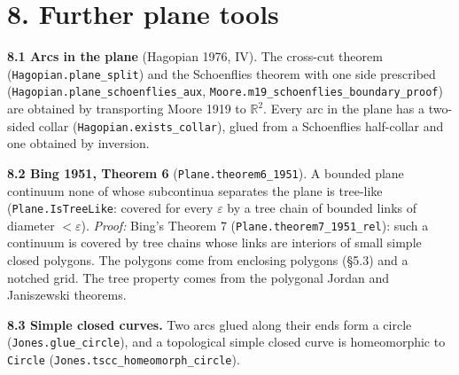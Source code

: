 \documentclass[11pt]{article}
\newcommand{\lean}[1]{\texttt{#1}}
\begin{document}
\section*{8. Further plane tools}

\textbf{8.1 Arcs in the plane} (Hagopian 1976, IV). The cross-cut theorem (\lean{Hagopian.\hspace{0pt}plane\_\hspace{0pt}split}) and the Schoenflies theorem with one side prescribed (\lean{Hagopian.\hspace{0pt}plane\_\hspace{0pt}schoenflies\_\hspace{0pt}aux}, \lean{Moore.\hspace{0pt}m19\_\hspace{0pt}schoenflies\_\hspace{0pt}boundary\_\hspace{0pt}proof}) are obtained by transporting Moore 1919 to $\mathbb{R}^2$. Every arc in the plane has a two-sided collar (\lean{Hagopian.\hspace{0pt}exists\_\hspace{0pt}collar}), glued from a Schoenflies half-collar and one obtained by inversion.

\textbf{8.2 Bing 1951, Theorem 6} (\lean{Plane.\hspace{0pt}theorem6\_\hspace{0pt}1951}). A bounded plane continuum none of whose subcontinua separates the plane is tree-like (\lean{Plane.\hspace{0pt}IsTreeLike}: covered for every $\varepsilon$ by a tree chain of bounded links of diameter $< \varepsilon$). \emph{Proof:} Bing's Theorem 7 (\lean{Plane.\hspace{0pt}theorem7\_\hspace{0pt}1951\_\hspace{0pt}rel}): such a continuum is covered by tree chains whose links are interiors of small simple closed polygons. The polygons come from enclosing polygons (\S{}5.3) and a notched grid. The tree property comes from the polygonal Jordan and Janiszewski theorems.

\textbf{8.3 Simple closed curves.} Two arcs glued along their ends form a circle (\lean{Jones.\hspace{0pt}glue\_\hspace{0pt}circle}), and a topological simple closed curve is homeomorphic to \lean{Circle} (\lean{Jones.\hspace{0pt}tscc\_\hspace{0pt}homeomorph\_\hspace{0pt}circle}).
\end{document}
